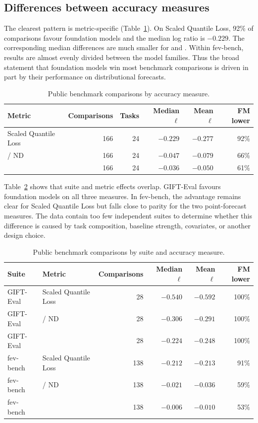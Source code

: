 \subsection{Differences between accuracy measures}
\label{subsec:metric-moderator}\label{subsec:moderator-outcomes}
\label{sec:moderator-results}

The clearest pattern is metric-specific (Table~\ref{tab:metric-split}). On
Scaled Quantile Loss, 92\% of comparisons favour foundation models and the
median log ratio is $-0.229$. The corresponding median differences are much
smaller for \WAPE{} and \MASE{}. Within fev-bench, \MASE{} results are almost
evenly divided between the model families. Thus the broad statement that
foundation models win most benchmark comparisons is driven in part by their
performance on distributional forecasts.

\begin{table}[htbp]
\centering
\caption{Public benchmark comparisons by accuracy measure.}
\label{tab:metric-split}
\small
\begin{tabular}{lrrrrr}
\toprule
Metric & Comparisons & Tasks & Median $\ell$ & Mean $\ell$ & FM lower \\
\midrule
Scaled Quantile Loss & 166 & 24 & $-0.229$ & $-0.277$ & 92\% \\
\WAPE{} / ND & 166 & 24 & $-0.047$ & $-0.079$ & 66\% \\
\MASE{} & 166 & 24 & $-0.036$ & $-0.050$ & 61\% \\
\bottomrule
\end{tabular}
\end{table}

Table~\ref{tab:suite-metric-split} shows that suite and metric effects overlap.
GIFT-Eval favours foundation models on all three measures. In fev-bench, the
advantage remains clear for Scaled Quantile Loss but falls close to parity for
the two point-forecast measures. The data contain too few independent suites
to determine whether this difference is caused by task composition, baseline
strength, covariates, or another design choice.

\begin{table}[htbp]
\centering
\caption{Public benchmark comparisons by suite and accuracy measure.}
\label{tab:suite-metric-split}
\small
\begin{tabular}{llrrrr}
\toprule
Suite & Metric & Comparisons & Median $\ell$ & Mean $\ell$ & FM lower \\
\midrule
GIFT-Eval & Scaled Quantile Loss & 28 & $-0.540$ & $-0.592$ & 100\% \\
GIFT-Eval & \WAPE{} / ND & 28 & $-0.306$ & $-0.291$ & 100\% \\
GIFT-Eval & \MASE{} & 28 & $-0.224$ & $-0.248$ & 100\% \\
fev-bench & Scaled Quantile Loss & 138 & $-0.212$ & $-0.213$ & 91\% \\
fev-bench & \WAPE{} / ND & 138 & $-0.021$ & $-0.036$ & 59\% \\
fev-bench & \MASE{} & 138 & $-0.006$ & $-0.010$ & 53\% \\
\bottomrule
\end{tabular}
\end{table}

